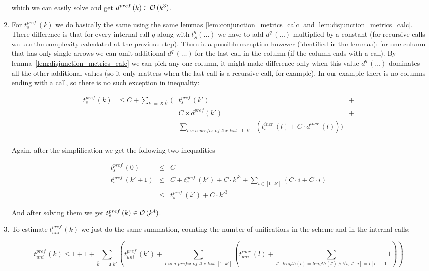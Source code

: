 \begin{enumerate}
which we can easily solve and get $d^{pref}\,(k) \in \mathcal{O}\,(k^3)$.

\item For $t_s^{pref}\,(k)$ we do basically the same using the same lemmas \ref{lem:conjunction_metrics_calc} and \ref{lem:disjunction_metrics_calc}. There difference is that for every internal call $q$ along with $t_S^q(\dots)$ we have to add $d^q\,(\dots)$
  multiplied by a constant (for recursive calls we use the complexity calculated at the previous step). There is a possible exception however (identified in the lemmas): for one column that has only single arrows we can omit additional $d^q\,(\dots)$ for the last call in the column (if the column ends with a call).
  By lemma~\ref{lem:disjunction_metrics_calc} we can pick any one column, it might make difference only when this value $d^q\,(\dots)$ dominates all the other additional values (so it only
  matters when the last call is a recursive call, for example). In our example there is no columns ending with a call, so there is no such exception in inequality:

  \[
\begin{array}{rclc}
  t_s^{pref}\,(k) & \le C + \sum_{\overline{k} \;=\; \texttt{S $\overline{k'}$}} (& t_s^{pref}\,(k') & + \\
                &     & C \times d^{pref}(k') & + \\
                &     & \sum_{\textit{$l$ is a prefix of the list $[1..k']$}} (t_s^{incr}\,(l) + C \cdot d^{incr}\,(l))) & \\
\end{array}
\]

Again, after the simplification we get the following two inequalities

\[ \begin{array}{rcl}
t_s^{pref}\,(0) &\le& C \\
t_s^{pref}\,(k' + 1) &\le& C + t_s^{pref}\,(k') + C \cdot k'^3 + \sum_{i \in [0..k']} (C \cdot i + C \cdot i) \\
                  &\le& t_s^{pref}\,(k') + C \cdot k'^3 
\end{array} \]

And after solving them we get $t_s^{pref}\,(k) \in \mathcal{O}\,(k^4)$.

\item To estimate $t_{uni}^{pref}\,(k)$ we just do the same summation, counting the number of unifications in the scheme and in the internal calls:

  \[
    t_{uni}^{pref}\,(k) \le 1 + 1 + \sum_{\overline{k} \;=\; \texttt{S $\overline{k'}$}} (t_{uni}^{pref}\,(k') + \sum_{\textit{$l$ is a prefix of the list $[1..k']$}} (t_{uni}^{incr}\,(l) + \sum_{l': \; length(l) = length(l') \land \forall i, \; l'[i] = l[i] + 1} 1))
    \]


\end{enumerate}
